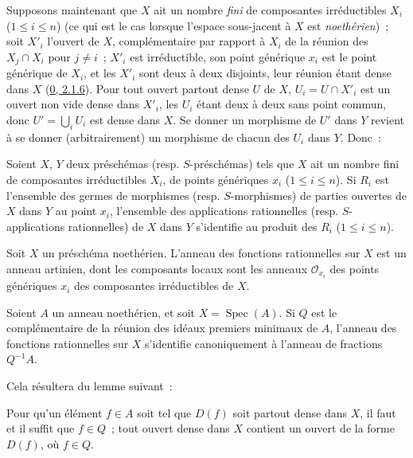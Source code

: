 \begin{env}[7.1.6]
\label{I.7.1.6-fr}
Supposons maintenant que $X$ ait un nombre \emph{fini} de composantes
irréductibles $X_i$ ($1\leq i\leq n$) (ce qui est le cas lorsque l'espace
sous-jacent à $X$ est \emph{noethérien})~; soit $X'_i$ l'ouvert de $X$,
complémentaire par rapport à $X_i$ de la réunion des $X_j\cap X_i$ pour
$j\neq i$~; $X'_i$ est irréductible, son point générique $x_i$ est le point
générique de $X_i$, et les $X'_i$ sont deux à deux disjoints, leur réunion
étant dense dans $X$ (\hyperref[0.2.1.6-fr]{0, 2.1.6}). Pour
tout ouvert partout dense $U$ de $X$, $U_i=U\cap X'_i$ est un ouvert non vide
dense dans $X'_i$, les $U_i$ étant deux à deux sans point commun, donc
$U'=\bigcup_i U_i$ est dense dans $X$. Se donner un morphisme de $U'$ dans $Y$
revient à se donner (arbitrairement) un morphisme de chacun des $U_i$ dans $Y$.
Donc~:
\end{env}

\begin{proposition}[7.1.7]
\label{I.7.1.7-fr}
Soient $X$, $Y$ deux préschémas (resp. $S$-préschémas) tels que $X$ ait un
nombre fini de composantes irréductibles $X_i$, de points génériques $x_i$
($1\leq i\leq n$). Si $R_i$ est l'ensemble des germes de morphismes (resp.
$S$-morphismes) de parties ouvertes de $X$ dans $Y$ au point $x_i$, l'ensemble
des applications rationnelles (resp. $S$-applications rationnelles) de $X$
dans $Y$ s'identifie au produit des $R_i$ ($1\leq i\leq n$).
\end{proposition}

\begin{corollary}[7.1.8]
\label{I.7.1.8-fr}
Soit $X$ un préschéma noethérien. L'anneau des fonctions rationnelles sur $X$
est un anneau artinien, dont les composants locaux sont les anneaux
$\mathscr{O}_{x_i}$ des points génériques $x_i$ des composantes irréductibles
de $X$.
\end{corollary}

\begin{corollary}[7.1.9]
\label{I.7.1.9-fr}
Soient $A$ un anneau noethérien, et soit $X=\operatorname{Spec}(A)$. Si $Q$ est
le complémentaire de la réunion des idéaux premiers minimaux de $A$, l'anneau
des fonctions rationnelles sur $X$ s'identifie canoniquement à l'anneau de
fractions $Q^{-1}A$.
\end{corollary}

Cela résultera du lemme suivant~:

\begin{lemma}[7.1.9.1]
\label{I.7.1.9.1-fr}
Pour qu'un élément $f\in A$ soit tel que $D(f)$ soit partout dense dans $X$, il
faut et il suffit que $f\in Q$~; tout ouvert dense dans $X$ contient un ouvert
de la forme $D(f)$, où $f\in Q$.
\end{lemma}

